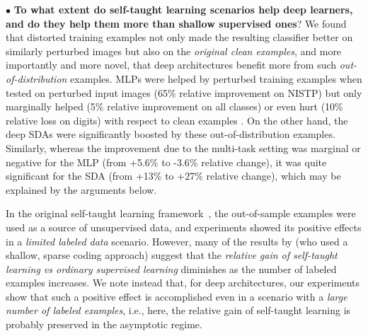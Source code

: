 \documentclass{article} %
\begin{document}
$\bullet$ %
{\bf To what extent do self-taught learning scenarios help deep learners,
and do they help them more than shallow supervised ones}?
We found that distorted training examples not only made the resulting
classifier better on similarly perturbed images but also on
the {\em original clean examples}, and more importantly and more novel,
that deep architectures benefit more from such {\em out-of-distribution}
examples. MLPs were helped by perturbed training examples when tested on perturbed input 
images (65\% relative improvement on NISTP) 
but only marginally helped (5\% relative improvement on all classes) 
or even hurt (10\% relative loss on digits)
with respect to clean examples . On the other hand, the deep SDAs
were significantly boosted by these out-of-distribution examples.
Similarly, whereas the improvement due to the multi-task setting was marginal or
negative for the MLP (from +5.6\% to -3.6\% relative change), 
it was quite significant for the SDA (from +13\% to +27\% relative change),
which may be explained by the arguments below.

In the original self-taught learning framework~\citep{RainaR2007}, the
out-of-sample examples were used as a source of unsupervised data, and
experiments showed its positive effects in a \emph{limited labeled data}
scenario. However, many of the results by \citet{RainaR2007} (who used a
shallow, sparse coding approach) suggest that the {\em relative gain of self-taught
learning vs ordinary supervised learning} diminishes as the number of labeled examples increases.
We note instead that, for deep
architectures, our experiments show that such a positive effect is accomplished
even in a scenario with a \emph{large number of labeled examples},
i.e., here, the relative gain of self-taught learning is probably preserved
in the asymptotic regime.
\end{document}
